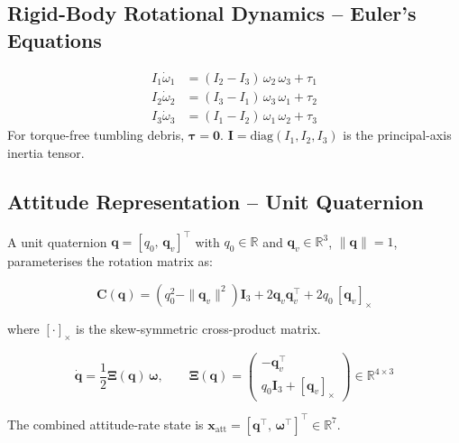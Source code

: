 \documentclass[12pt, a4paper]{article}
\newcommand{\vx}{\mathbf{x}}
\newcommand{\vq}{\mathbf{q}}
\newcommand{\vw}{\bm{\omega}}
\begin{document}
\subsection{Rigid-Body Rotational Dynamics -- Euler's Equations}

\begin{formulabox}[title=Euler's Equations (Body Frame)]
\begin{align}
I_1 \dot{\omega}_1 &= (I_2 - I_3)\,\omega_2\,\omega_3 + \tau_1 \\
I_2 \dot{\omega}_2 &= (I_3 - I_1)\,\omega_3\,\omega_1 + \tau_2 \\
I_3 \dot{\omega}_3 &= (I_1 - I_2)\,\omega_1\,\omega_2 + \tau_3
\end{align}
For torque-free tumbling debris, $\bm{\tau} = \mathbf{0}$.
$\mathbf{I} = \mathrm{diag}(I_1, I_2, I_3)$ is the principal-axis
inertia tensor.
\end{formulabox}

\subsection{Attitude Representation -- Unit Quaternion}

A unit quaternion $\vq = [q_0,\, \mathbf{q}_v]^\top$ with $q_0 \in
\mathbb{R}$ and $\mathbf{q}_v \in \mathbb{R}^3$, $\|\vq\| = 1$,
parameterises the rotation matrix as:

\begin{equation}
\mathbf{C}(\vq) = (q_0^2 - \|\mathbf{q}_v\|^2)\mathbf{I}_3
+ 2\mathbf{q}_v\mathbf{q}_v^\top + 2q_0\,[\mathbf{q}_v]_\times
\end{equation}

where $[\cdot]_\times$ is the skew-symmetric cross-product matrix.

\begin{formulabox}[title=Quaternion Kinematics]
\begin{equation}
\dot{\vq} = \frac{1}{2} \bm{\Xi}(\vq)\, \vw, \qquad
\bm{\Xi}(\vq) =
\begin{pmatrix}
-\mathbf{q}_v^\top \\
q_0 \mathbf{I}_3 + [\mathbf{q}_v]_\times
\end{pmatrix} \in \mathbb{R}^{4\times3}
\end{equation}
\end{formulabox}

\noindent The combined attitude-rate state is $\vx_{\mathrm{att}} =
[\vq^\top,\, \vw^\top]^\top \in \mathbb{R}^7$.
\end{document}
